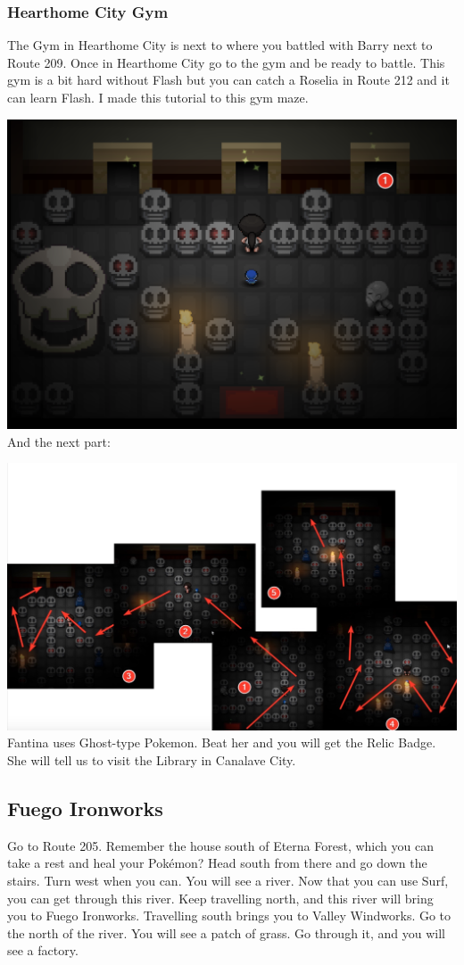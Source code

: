 \documentclass[11pt]{article}
\begin{document}
\subsubsection{Hearthome City Gym}\label{subsubsec:hearthome-city-gym}
The Gym in Hearthome City is next to where you battled with Barry next to Route 209.
Once in Hearthome City go to the gym and be ready to battle.
This gym is a bit hard without Flash but you can catch a Roselia in Route 212
and it can learn Flash.
I made this tutorial to this gym maze.

\includegraphics[width=\textwidth]{walkthrough/Sinnoh/hearthome_gym_1}
And the next part:

\includegraphics[width=\textwidth]{walkthrough/Sinnoh/hearthome_gym_2}
Fantina uses Ghost-type Pokemon.
Beat her and you will get the Relic Badge.
She will tell us to visit the Library in Canalave City.

\subsection{Fuego Ironworks}\label{subsec:fuego-ironworks}
Go to Route 205.
Remember the house south of Eterna Forest,
which you can take a rest and heal your Pokémon?
Head south from there and go down the stairs.
Turn west when you can.
You will see a river.
Now that you can use Surf, you can get through this river.
Keep travelling north, and this river will bring you to Fuego Ironworks.
Travelling south brings you to Valley Windworks.
Go to the north of the river.
You will see a patch of grass.
Go through it, and you will see a factory.
\end{document}
